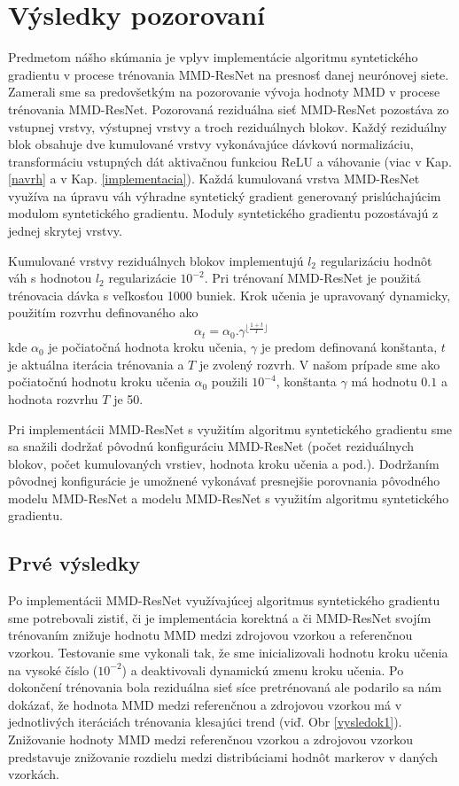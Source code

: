 \chapter{Výsledky pozorovaní}
\label{vysledky}

Predmetom nášho skúmania je vplyv implementácie algoritmu syntetického gradientu v procese trénovania MMD-ResNet na presnosť danej neurónovej siete. Zamerali sme sa predovšetkým na pozorovanie vývoja hodnoty MMD v procese trénovania MMD-ResNet. Pozorovaná reziduálna sieť MMD-ResNet pozostáva zo vstupnej vrstvy, výstupnej vrstvy a troch reziduálnych blokov. Každý reziduálny blok obsahuje dve kumulované vrstvy vykonávajúce dávkovú normalizáciu, transformáciu vstupných dát aktivačnou funkciou ReLU \cite{Goh1995} a váhovanie (viac v Kap. \ref{navrh} a v Kap. \ref{implementacia}). Každá kumulovaná vrstva MMD-ResNet využíva na úpravu váh výhradne syntetický gradient generovaný prislúchajúcim modulom syntetického gradientu. Moduly syntetického gradientu pozostávajú z jednej skrytej vrstvy.

Kumulované vrstvy reziduálnych blokov implementujú $l_2$ regularizáciu hodnôt váh s hodnotou $l_2$ regularizácie $10^{-2}$. Pri trénovaní MMD-ResNet je použitá trénovacia dávka s veľkosťou 1000 buniek. Krok učenia je upravovaný dynamicky, použitím rozvrhu definovaného ako 
\[
    \alpha_t = \alpha_0 . \gamma^{\lfloor\frac{1+t}{T}\rfloor}
\]
kde $\alpha_0$ je počiatočná hodnota kroku učenia, $\gamma$ je predom definovaná konštanta, $t$ je aktuálna iterácia trénovania a $T$ je zvolený rozvrh. V našom prípade sme ako počiatočnú hodnotu kroku učenia $\alpha_0$ použili $10^{-4}$, konštanta $\gamma$ má hodnotu $0.1$ a hodnota rozvrhu $T$ je 50.

Pri implementácii MMD-ResNet s využitím algoritmu syntetického gradientu sme sa snažili dodržať pôvodnú konfiguráciu MMD-ResNet (počet reziduálnych blokov, počet kumulovaných vrstiev, hodnota kroku učenia a pod.). Dodržaním pôvodnej konfigurácie je umožnené vykonávať presnejšie porovnania pôvodného modelu MMD-ResNet a modelu MMD-ResNet s využitím algoritmu syntetického gradientu.

\section{Prvé výsledky}
\label{prve_vysledky}

Po implementácii MMD-ResNet využívajúcej algoritmus syntetického gradientu sme potrebovali zistiť, či je implementácia korektná a či MMD-ResNet svojím trénovaním znižuje hodnotu MMD medzi zdrojovou vzorkou a referenčnou vzorkou. Testovanie sme vykonali tak, že sme inicializovali hodnotu kroku učenia na vysoké číslo ($10^{-2}$) a deaktivovali dynamickú zmenu kroku učenia. Po dokončení trénovania bola reziduálna sieť síce pretrénovaná ale podarilo sa nám dokázať, že hodnota MMD medzi referenčnou a zdrojovou vzorkou má v jednotlivých iteráciách trénovania klesajúci trend (viď. Obr \ref{vysledok1}). Znižovanie hodnoty MMD medzi referenčnou vzorkou a zdrojovou vzorkou predstavuje znižovanie rozdielu medzi distribúciami hodnôt markerov v daných vzorkách.

